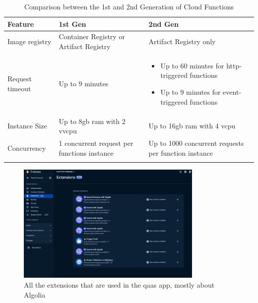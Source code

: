 \begin{longtable}{|p{5cm}|p{5.5cm}|p{5.5cm}|}
      \hline
      \rowcolor{blue!20}
      Feature         & 1st Gen                                                     & 2nd Gen                                                       \\
      \endfirsthead
      \hline
      Image registry  & Container Registry or Artifact Registry                     & Artifact Registry only                                        \\
      \hline
      Request timeout & Up to 9 minutes                                             & \begin{itemize}
                                                                                            \item Up to 60 minutes for \acrshort{http}-triggered functions
                                                                                            \item Up to 9 minutes for event-triggered functions
                                                                                      \end{itemize} \\
      \hline
      Instance Size   & Up to 8\acrshort{gb} \acrshort{ram} with 2 v\acrshort{vcpu} & Up to 16\acrshort{gb} \acrshort{ram} with 4 \acrshort{vcpu}   \\
      \hline
      Concurrency     & 1 concurrent request per functions instance                 & Up to 1000 concurrent requests per function instance          \\
      \hline
      \caption{Comparison between the 1st and 2nd Generation of Cloud Functions}
      \label{tab:restvsoap}
\end{longtable}

\begin{figure}[htbp]
      \centering
      \includegraphics[width=0.8\textwidth]{Figures/Firebase/Extensions.png}
      \caption{All the extensions that are used in the \acrshort{qaas} app, mostly about Algolia}
\end{figure}

